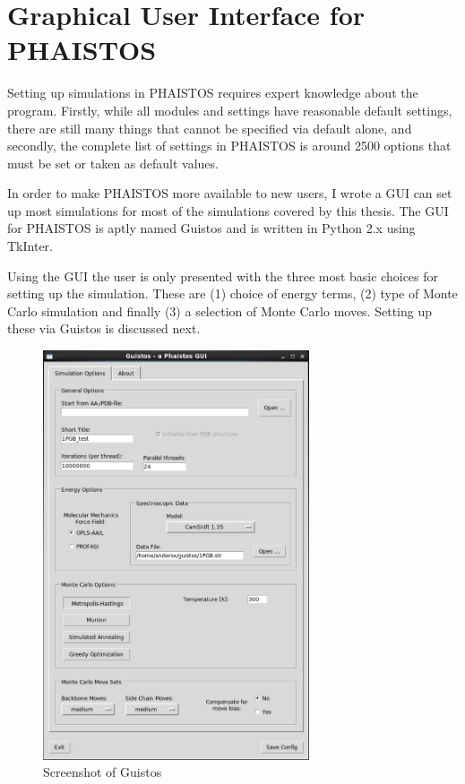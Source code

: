 \chapter{Graphical User Interface for PHAISTOS}

Setting up simulations in PHAISTOS requires expert knowledge about the program. 
Firstly, while all modules and settings have reasonable default settings, there are still many things that cannot be specified via default alone, and secondly, the complete list of settings in PHAISTOS is around 2500 options that must be set or taken as default values.

In order to make PHAISTOS more available to new users, I wrote a GUI can set up most simulations for most of the simulations covered by this thesis.
The GUI for PHAISTOS is aptly named Guistos and is written in Python 2.x using TkInter.

Using the GUI the user is only presented with the three most basic choices for setting up the simulation.
These are (1) choice of energy terms, (2) type of Monte Carlo simulation and finally (3) a selection of Monte Carlo moves.
Setting up these via Guistos is discussed next.

\begin{figure}
    \centering
    \includegraphics[width=0.70\textwidth]{figures/guistos.pdf}
    \caption{Screenshot of Guistos}
    \label{fig:guistos}
\end{figure}

